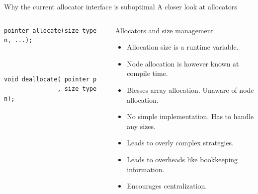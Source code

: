 \documentclass[10pt,aspectratio=169]{beamer}
\begin{document}
\begin{frame}[fragile]
{Why the current allocator interface is suboptimal}
{A closer look at allocators}
\begin{columns}
\begin{column}{0.35\textwidth}

\begin{lstlisting}
pointer allocate(size_type n, ...);



void deallocate( pointer p
               , size_type n);
\end{lstlisting}

\end{column}

\begin{column}{0.55\textwidth}
\begin{block} {Allocators and size management}
\begin{itemize}
\item Allocation size is a runtime variable.
\item Node allocation is however known at compile time.
\item Blesses array allocation. Unaware of node allocation.
\item No simple implementation. Has to handle any sizes.
\item Leads to overly complex strategies.
\item Leads to overheads like bookkeeping information.
\item Encourages centralization.
\end{itemize}

\end{block}

\end{column}
\end{columns}
\end{frame}
\end{document}
